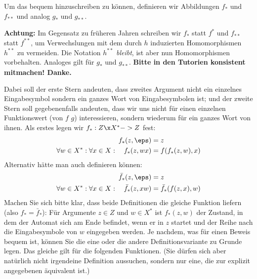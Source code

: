 Um das bequem hinzuschreiben zu können, definieren wir Abbildungen
$f_*$ und $f_{**}$ und analog $g_*$ und $g_{**}$. 
%
\begin{tutorium}
  \textbf{Achtung:} Im Gegensatz zu früheren Jahren schreiben wir
  $f_*$ statt $f^*$ und $f_{**}$ statt $f^{**}$, um Verwechslungen mit
  dem durch $h$ induzierten Homomorphismen $h^{**}$ zu vermeiden.
  Die Notation $h^{**}$ \emph{bleibt}, ist aber nun Homomorphismen
  vorbehalten.
  Analoges gilt für $g_*$ und $g_{**}$.
  \textbf{Bitte in den Tutorien konsistent mitmachen! Danke.}
\end{tutorium}
%
Dabei soll der erste
Stern andeuten, dass zweites Argument nicht ein einzelnes
Eingabesymbol sondern ein ganzes Wort von Eingabesymbolen ist; und der
zweite Stern soll gegebenenfalls andeuten, dass wir uns nicht für
einen einzelnen Funktionswert (von $f$ \bzw $g$) interessieren,
sondern wiederum für ein ganzes Wort von ihnen.  Als erstes legen wir
$f_*:Z\x X^*->Z$ fest:
\begin{align*}
  f_*(z, \eps) &= z \\
  \forall w\in X^*: \forall x\in X: \text{\quad}
  f_*(z, wx)   &= f(f_*(z,w),x) 
\end{align*}
Alternativ hätte man auch definieren können:
\begin{align*}
  \bar{f}_*(z, \eps) &= z \\
  \forall w\in X^*: \forall x\in X: \text{\quad}
  \bar{f}_*(z, xw)   &= \bar{f}_*(f(z,x),w) 
\end{align*}
Machen Sie sich bitte klar, dass beide Definitionen die gleiche
Funktion liefern (also $f_*=\bar{f}_*$): Für Argumente $z\in Z$ und
$w\in X^*$ ist $f_*(z,w)$ der Zustand, in dem der Automat sich am Ende
befindet, wenn er in $z$ startet und der Reihe nach die Eingabesymbole
von $w$ eingegeben werden. Je nachdem, was für einen Beweis bequem
ist, können Sie die eine oder die andere Definitionsvariante zu Grunde
legen.  Das gleiche gilt für die folgenden Funktionen. (Sie dürfen
sich aber natürlich nicht irgendeine Definition aussuchen, sondern nur
eine, die zur explizit angegebenen äquivalent ist.)

